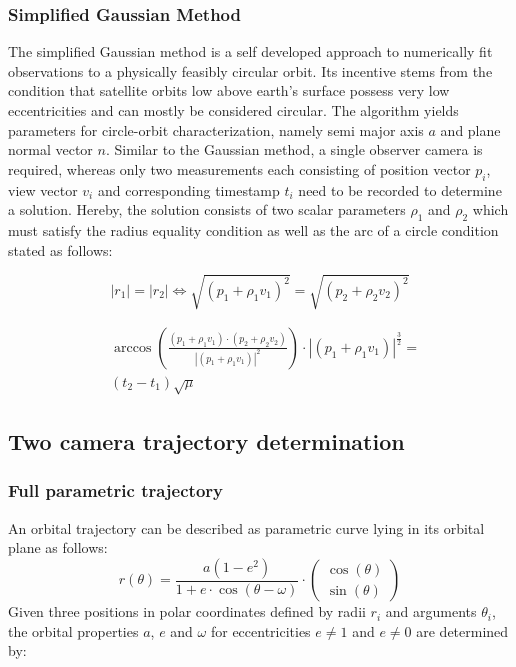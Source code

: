 \documentclass[10pt,a4paper]{article}
\begin{document}
	\subsubsection{Simplified Gaussian Method}\label{sec:simplified_gauss_method}
	The simplified Gaussian method is a self developed approach to numerically fit observations to a physically feasibly circular orbit. Its incentive stems from the condition that satellite orbits low above earth's surface possess very low eccentricities and can mostly be considered circular. The algorithm yields parameters for circle-orbit characterization, namely semi major axis $a$ and plane normal vector $n$. \newline Similar to the Gaussian method, a single observer camera is required, whereas only two measurements each consisting of position vector $p_i$, view vector $v_i$ and corresponding timestamp $t_i$ need to be recorded to determine a solution. Hereby, the solution consists of two scalar parameters $\rho_1$ and $\rho_2$ which must satisfy the radius equality condition as well as the arc of a circle condition stated as follows:
	
	\begin{equation}
		\label{circle_gauss_circle_condition}
		|r_1|=|r_2|\Leftrightarrow \sqrt{(p_1+\rho_1v_1)^2}=\sqrt{(p_2+\rho_2v_2)^2}
	\end{equation}

	
	\begin{equation}
		\label{circle_gauss_time_condition}
		\begin{aligned}
			&\arccos\left(\frac{(p_1+\rho_1v_1)\cdot (p_2+\rho_2v_2)}{|(p_1+\rho_1v_1)|^2}\right)\cdot|(p_1+\rho_1v_1)|^{\frac{3}{2}}=\\
			&(t_2-t_1)\sqrt{\mu}
		\end{aligned}
	\end{equation}
	\cite{orbit_determination_preliminary}
	
	\subsection{Two camera trajectory determination}\label{sec:two_camera_determination}
	\subsubsection{Full parametric trajectory}\label{sec:full_parametric_trajectory}
	An orbital trajectory can be described as parametric curve lying in its orbital plane as follows: 
	\begin{equation}
		r(\theta)=\frac{a(1-e^2)}{1+e\cdot\cos(\theta-\omega)} \cdot \begin{pmatrix}
			\cos(\theta) \\
			\sin(\theta)
		\end{pmatrix}
	\end{equation}
	\noindent
	Given three positions in polar coordinates defined by radii $r_i$ and arguments $\theta_i$, the orbital properties $a$, $e$ and $\omega$ for eccentricities $e\neq 1$ and $e\neq 0$ are determined by:
	
\end{document}
